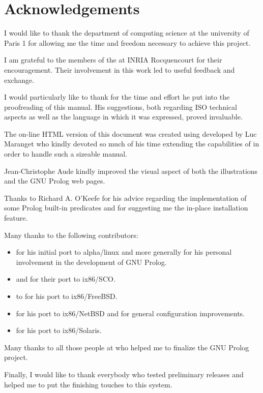 \newpage
\section{Acknowledgements}

I would like to thank the 
{department of computing science} at the university of Paris 1 for allowing
me the time and freedom necessary to achieve this project.

I am grateful to the members of the  at 
{INRIA Rocquencourt} for their encouragement. Their involvement in this work
led to useful feedback and exchange.

I would particularly like to thank
 for the time and
effort he put into the proofreading of this manual. His suggestions, both
regarding ISO technical aspects as well as the language in which it was
expressed, proved invaluable.

The on-line HTML version of this document was created using
 developed by Luc Maranget who kindly devoted so much
of his time extending the capabilities of {\hevea} in order to handle such a
sizeable manual.

Jean-Christophe Aude kindly improved the visual aspect of both the
illustrations and the GNU Prolog web pages.

Thanks to Richard A. O'Keefe for his advice regarding the implementation of
some Prolog built-in predicates and for suggesting me the in-place
installation feature.

Many thanks to the following contributors:

\begin{itemize}

\item {} for his initial port to
alpha/linux and more generally for his personal involvement in the
development of GNU Prolog.

\item {} and
 for their port to 
ix86/SCO.

\item {} to for his port to
ix86/FreeBSD.

\item {} for his port to
ix86/NetBSD and for general configuration improvements.

\item {} for
his port to ix86/Solaris.

\end{itemize}

Many thanks to all those people at  who helped
me to finalize the GNU Prolog project.

Finally, I would like to thank everybody who tested preliminary releases and
helped me to put the finishing touches to this system.

